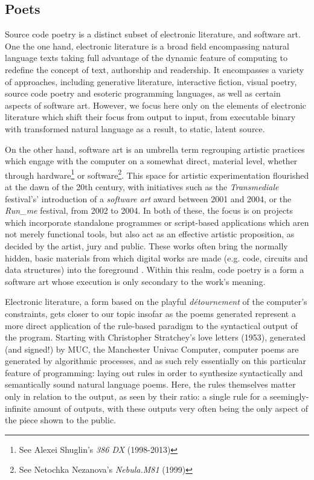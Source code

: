\pagebreak

\subsection{Poets}
\label{subsec:poets}

Source code poetry is a distinct subset of electronic literature, and software art. One the one hand, electronic literature is a broad field encompassing natural language texts taking full advantage of the dynamic feature of computing to redefine the concept of text, authorship and readership. It encompasses a variety of approaches, including generative literature, interactive fiction, visual poetry, source code poetry and esoteric programming languages, as well as certain aspects of software art. However, we focus here only on the elements of electronic literature which shift their focus from output to input, from executable binary with transformed natural language as a result, to static, latent source.

On the other hand, software art is an umbrella term regrouping artistic practices which engage with the computer on a somewhat direct, material level, whether through hardware\footnote{See Alexei Shuglin's \emph{386 DX} (1998-2013)} or software\footnote{See Netochka Nezanova's \emph{Nebula.M81} (1999)}. This space for artistic experimentation flourished at the dawn of the 20th century, with initiatives such as the \emph{Transmediale} festival's' introduction of a \emph{software art} award between 2001 and 2004, or the \emph{Run\_me} festival, from 2002 to 2004. In both of these, the focus is on projects which incorporate standalone programmes or script-based applications which aren not merely functional tools, but also act as an effective artistic proposition, as decided by the artist, jury and public. These works often bring the normally hidden, basic materials from which digital works are made (e.g. code, circuits and data structures) into the foreground \citep{yuill_code_2004}. Within this realm, code poetry is a form a software art whose execution is only secondary to the work's meaning.

Electronic literature, a form based on the playful \emph{détournement} of the computer's constraints, gets closer to our topic insofar as the poems generated represent a more direct application of the rule-based paradigm to the syntactical output of the program. Starting with Christopher Stratchey's love letters (1953), generated (and signed!) by MUC, the Manchester Univac Computer, computer poems are generated by algorithmic processes, and as such rely essentially on this particular feature of programming: laying out rules in order to synthesize syntactically and semantically sound natural language poems. Here, the rules themselves matter only in relation to the output, as seen by their ratio: a single rule for a seemingly-infinite amount of outputs, with these outputs very often being the only aspect of the piece shown to the public.

